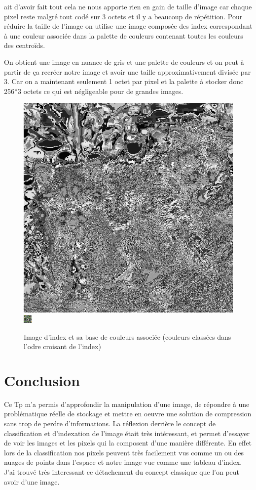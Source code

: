 \documentclass{article}
\begin{document}
ait d'avoir fait tout cela ne nous apporte rien en gain de taille d'image car chaque pixel reste malgré tout codé sur 3 octets et il y a beaucoup de répétition.
Pour réduire la taille de l'image on utilise une image composée des index correspondant à une couleur associée dans la palette de couleurs contenant toutes les couleurs des centroïds.

On obtient une image en nuance de gris et une palette de couleurs et on peut à partir de ça recréer notre image et avoir une taille approximativement divisée par 3.
Car on a maintenant seulement 1 octet par pixel et la palette à stocker donc 256*3 octets ce qui est négligeable pour de grandes images.

\begin{figure}[h]
\centerline{\includegraphics[scale=0.5]{./rendus/Q8.png} \includegraphics[scale=10]{./rendus/Palette256.png}}
\caption{Image d'index et sa base de couleurs associée (couleurs classées dans l'odre croisant de l'index)}
\end{figure}

\section*{Conclusion}
Ce Tp m'a permis d'approfondir la manipulation d'une image, de répondre à une problématique réelle de stockage et mettre en oeuvre une solution de compression sans trop de perdre d'informations.
La réflexion derrière le concept de classification et d'indexation de l'image était très intéressant, et permet d'essayer de voir les images et les pixels qui la composent d'une manière différente. En effet lors de la classification nos pixels peuvent très facilement vus comme un ou des nuages de points dans l'espace et notre image vue comme une tableau d'index.
J'ai trouvé très interessant ce détachement du concept classique que l'on peut avoir d'une image.
\end{document}
